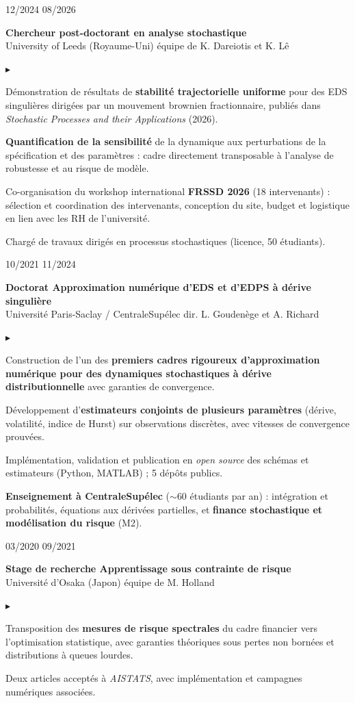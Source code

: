 \documentclass[10pt,a4paper]{article}
\newlength{\datecol}\setlength{\datecol}{0.165\textwidth}
\newlength{\gutter}\setlength{\gutter}{1em}
\newlength{\bodycol}
\newcommand{\entry}[3]{%
  \par\vspace{1.0ex plus 0.9ex minus 0.1ex}\noindent
  \begin{minipage}[t]{\datecol}
    \vspace{0pt}\raggedright\small\color{muted}#1
  \end{minipage}%
  \hspace{\gutter}%
  \begin{minipage}[t]{\bodycol}
    \vspace{0pt}\raggedright
    {\headingfont\bfseries\small #2}\\[0.15ex]
    {\small\color{accent}#3}
  \end{minipage}%
  \par\vspace{0.3ex}
}
\newenvironment{bullets}
  {\begin{list}{\textcolor{accent}{\scriptsize$\blacktriangleright$}}{%
      \setlength{\leftmargin}{\datecol}
      \addtolength{\leftmargin}{\gutter}
      \addtolength{\leftmargin}{1.25em}
      \setlength{\rightmargin}{0pt}
      \setlength{\labelwidth}{0.9em}
      \setlength{\labelsep}{0.35em}
      \setlength{\itemsep}{0.2ex}
      \setlength{\parsep}{0pt}
      \setlength{\topsep}{0.4ex}
      \setlength{\partopsep}{0pt}
      \small}}
  {\end{list}}
\begin{document}
\entry{12/2024 \textemdash{} 08/2026}{Chercheur post-doctorant en analyse stochastique}{University of Leeds (Royaume-Uni) \textemdash{} équipe de K. Dareiotis et K. Lê}
\begin{bullets}
  \item Démonstration de résultats de \textbf{stabilité trajectorielle uniforme} pour des EDS singulières
  dirigées par un mouvement brownien fractionnaire, publiés dans \emph{Stochastic Processes and their
  Applications} (2026).
  \item \textbf{Quantification de la sensibilité} de la dynamique aux perturbations de la spécification et
  des paramètres : cadre directement transposable à l'analyse de robustesse et au risque de modèle.
  \item Co-organisation du workshop international \textbf{FRSSD 2026} (18 intervenants) : sélection et
  coordination des intervenants, conception du site, budget et logistique en lien avec les RH de l'université.
  \item Chargé de travaux dirigés en processus stochastiques (licence, 50 étudiants).
\end{bullets}

\pagebreak

\entry{10/2021 \textemdash{} 11/2024}{Doctorat \textemdash{} Approximation numérique d'EDS et d'EDPS à dérive singulière}{Université Paris-Saclay / CentraleSupélec \textemdash{} dir. L. Goudenège et A. Richard}
\begin{bullets}
  \item Construction de l'un des \textbf{premiers cadres rigoureux d'approximation numérique pour des
  dynamiques stochastiques à dérive distributionnelle} avec garanties de convergence.
  \item Développement d'\textbf{estimateurs conjoints de plusieurs paramètres} (dérive, volatilité, indice de
  Hurst) sur observations discrètes, avec vitesses de convergence prouvées.
  \item Implémentation, validation et publication en \emph{open source} des schémas et estimateurs
  (Python, MATLAB) ; 5 dépôts publics.
  \item \textbf{Enseignement à CentraleSupélec} ($\sim$60 étudiants par an) : intégration et probabilités,
  équations aux dérivées partielles, et \textbf{finance stochastique et modélisation du risque} (M2).
\end{bullets}

\entry{03/2020 \textemdash{} 09/2021}{Stage de recherche \textemdash{} Apprentissage sous contrainte de risque}{Université d'Osaka (Japon) \textemdash{} équipe de M. Holland}
\begin{bullets}
  \item Transposition des \textbf{mesures de risque spectrales} du cadre financier vers l'optimisation
  statistique, avec garanties théoriques sous pertes non bornées et distributions à queues lourdes.
  \item Deux articles acceptés à \emph{AISTATS}, avec implémentation et campagnes numériques associées.
\end{bullets}
\end{document}
